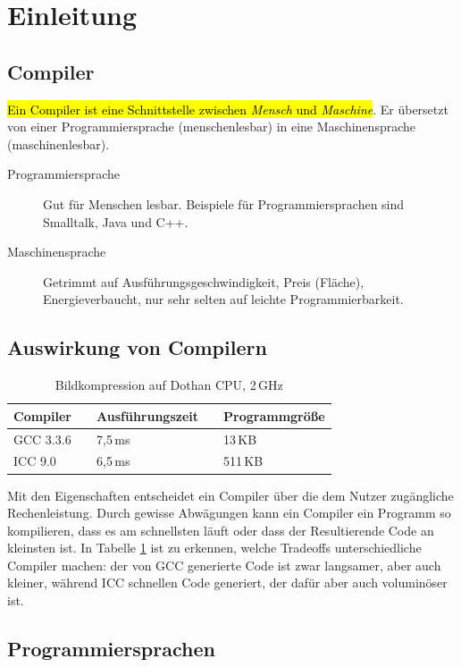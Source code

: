 \documentclass[
  ngerman,
  DIV=12
]{scrartcl}
\newcommand{\tablespacing}[1]{\renewcommand{\arraystretch}{#1}}
\begin{document}
\section{Einleitung}

\subsection{Compiler}

\hl{Ein Compiler ist eine Schnittstelle zwischen \emph{Mensch} und \emph{Maschine}}. Er übersetzt von einer Programmiersprache (menschenlesbar) in eine Maschinensprache (maschinenlesbar).

\begin{description}
  \item[Programmiersprache] Gut für Menschen lesbar. Beispiele für Programmiersprachen sind Smalltalk, Java und C++.
  \item[Maschinensprache] Getrimmt auf Ausführungsgeschwindigkeit, Preis (Fläche), Energieverbaucht, nur sehr selten auf leichte Programmierbarkeit.
\end{description}

\subsection{Auswirkung von Compilern}
\begin{table}[h]
\centering
\tablespacing{1.2}
\begin{tabular}{@{}lp{.5cm}lp{.5cm}l@{}}
  \toprule
    Compiler && Ausführungszeit && Programmgröße\\
    \midrule
      GCC 3.3.6 && 7,5\,ms && 13\,KB\\
      ICC 9.0 && 6,5\,ms && 511\,KB\\
    \bottomrule
\end{tabular}
\caption{Bildkompression auf Dothan CPU, 2\,GHz}\label{fig:compilerspeed}
\end{table}
\noindent
Mit den Eigenschaften entscheidet ein Compiler über die dem Nutzer zugängliche Rechenleistung. Durch gewisse Abwägungen kann ein Compiler ein Programm so kompilieren, dass es am schnellsten läuft oder dass der Resultierende Code an kleinsten ist.
In Tabelle \ref{fig:compilerspeed} ist zu erkennen, welche Tradeoffs unterschiedliche Compiler machen: der von GCC generierte Code ist zwar langsamer, aber auch kleiner, während ICC schnellen Code generiert, der dafür aber auch voluminöser ist.

\subsection{Programmiersprachen}
\end{document}
